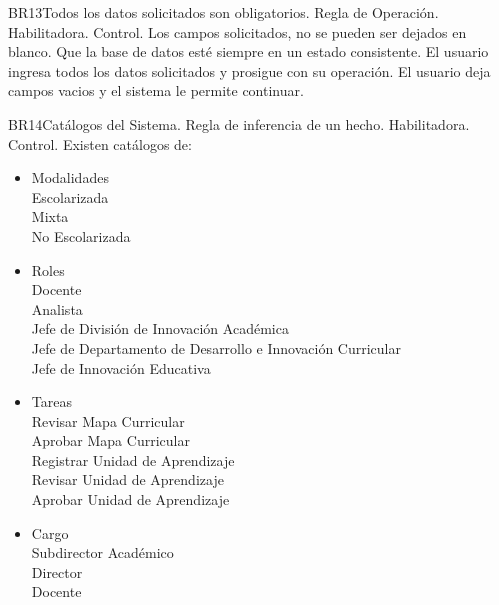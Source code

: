 \begin{BussinesRule}{BR13}{Todos los datos solicitados son obligatorios.}
    \BRitem[Tipo:] Regla de Operación.
    \BRitem[Clase:] Habilitadora.
    \BRitem[Nivel:] Control.
    \BRitem[Descripción:] Los campos solicitados, no se pueden ser dejados en blanco.
    \BRitem[Sentencia:]
    \BRitem[Motivación: ]Que la base de datos esté siempre en un estado consistente.
     El usuario ingresa todos los datos solicitados y prosigue con su operación.
    El usuario deja campos vacios y el sistema le permite continuar.
\end{BussinesRule}
\begin{BussinesRule}{BR14}{Catálogos del Sistema.}
    \BRitem[Tipo: ]Regla de inferencia de un hecho.
    \BRitem[Clase: ]Habilitadora.
    \BRitem[Nivel: ]Control.
    \BRitem[Descripción: ]Existen catálogos de:
    \begin{itemize}
        \item Modalidades\\
            Escolarizada\\
            Mixta\\
            No Escolarizada
        \item Roles\\
            Docente\\
            Analista\\
            Jefe de División de Innovación Académica\\
            Jefe de Departamento de Desarrollo e Innovación Curricular\\
            Jefe de Innovación Educativa
        \item Tareas\\
            Revisar Mapa Curricular\\
            Aprobar Mapa Curricular\\
            Registrar Unidad de Aprendizaje\\
            Revisar Unidad de Aprendizaje\\
            Aprobar Unidad de Aprendizaje
        \item Cargo\\
            Subdirector Académico\\
            Director\\
            Docente\\

\end{itemize}
\end{BussinesRule}
